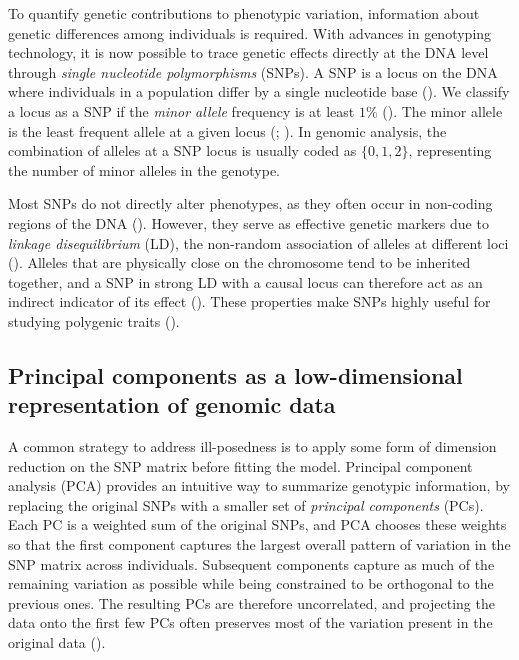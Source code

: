 To quantify genetic contributions to phenotypic variation, information about genetic differences among individuals is required.
With advances in genotyping technology, it is now possible to trace genetic effects directly at the DNA level through \textit{single nucleotide polymorphisms} (SNPs). A SNP is a locus on the DNA where individuals in a population differ by a single nucleotide base (\cite{brookes_essence_1999}). 
We classify a locus as a SNP if the \textit{minor allele} frequency is at least $1\%$ (\cite{karki_defining_2015}). 
The minor allele is the least frequent allele at a given locus (\cite{conner_primer_2004}; \cite{brookes_essence_1999}). 
%
In genomic analysis, the combination of alleles at a SNP locus is usually coded as $\{0,1,2\}$, representing the number of minor alleles in the genotype. 

Most SNPs do not directly alter phenotypes, as they often occur in non-coding regions of the DNA (\cite{visscher_five_2012}). However, they serve as effective genetic markers due to \textit{linkage disequilibrium} (LD), the non-random association of alleles at different loci (\cite{bush_chapter_2012}). Alleles that are physically close on the chromosome tend to be inherited together, and a SNP in strong LD with a causal locus can therefore act as an indirect indicator of its effect (\cite{ashraf_genomic_2022}). These properties make SNPs highly useful for studying polygenic traits (\cite{syvanen_accessing_2001}).

\subsection{Principal components as a low-dimensional representation of genomic data}


A common strategy to address ill-posedness is to apply some form of dimension reduction on the SNP matrix before fitting the model. Principal component analysis (PCA) provides an intuitive way to summarize genotypic information, by replacing the original SNPs with a smaller set of \textit{principal components} (PCs). Each PC is a weighted sum of the original SNPs, and PCA chooses these weights so that the first component captures the largest overall pattern of variation in the SNP matrix across individuals.
Subsequent components capture as much of the remaining variation as possible while being constrained to be orthogonal to the previous ones. The resulting PCs are therefore uncorrelated, and projecting the data onto the first few PCs often preserves most of the variation present in the original data
(\cite{abdi_principal_2010}).


